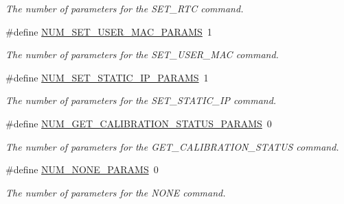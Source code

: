 \begin{DoxyCompactItemize}
\begin{DoxyCompactList}\small\item\em The number of parameters for the S\-E\-T\-\_\-\-R\-T\-C command. \end{DoxyCompactList}\item 
\hypertarget{group__command__interpreter_gaafcaaef444e34052e8d96c863c90543f}{\#define \hyperlink{group__command__interpreter_gaafcaaef444e34052e8d96c863c90543f}{N\-U\-M\-\_\-\-S\-E\-T\-\_\-\-U\-S\-E\-R\-\_\-\-M\-A\-C\-\_\-\-P\-A\-R\-A\-M\-S}~1}\label{group__command__interpreter_gaafcaaef444e34052e8d96c863c90543f}

\begin{DoxyCompactList}\small\item\em The number of parameters for the S\-E\-T\-\_\-\-U\-S\-E\-R\-\_\-\-M\-A\-C command. \end{DoxyCompactList}\item 
\hypertarget{group__command__interpreter_ga4e0199c558a2061732f2e8a1245cb4a2}{\#define \hyperlink{group__command__interpreter_ga4e0199c558a2061732f2e8a1245cb4a2}{N\-U\-M\-\_\-\-S\-E\-T\-\_\-\-S\-T\-A\-T\-I\-C\-\_\-\-I\-P\-\_\-\-P\-A\-R\-A\-M\-S}~1}\label{group__command__interpreter_ga4e0199c558a2061732f2e8a1245cb4a2}

\begin{DoxyCompactList}\small\item\em The number of parameters for the S\-E\-T\-\_\-\-S\-T\-A\-T\-I\-C\-\_\-\-I\-P command. \end{DoxyCompactList}\item 
\hypertarget{group__command__interpreter_ga4fc716dc88ef0cbdbc503e78eab47df4}{\#define \hyperlink{group__command__interpreter_ga4fc716dc88ef0cbdbc503e78eab47df4}{N\-U\-M\-\_\-\-G\-E\-T\-\_\-\-C\-A\-L\-I\-B\-R\-A\-T\-I\-O\-N\-\_\-\-S\-T\-A\-T\-U\-S\-\_\-\-P\-A\-R\-A\-M\-S}~0}\label{group__command__interpreter_ga4fc716dc88ef0cbdbc503e78eab47df4}

\begin{DoxyCompactList}\small\item\em The number of parameters for the G\-E\-T\-\_\-\-C\-A\-L\-I\-B\-R\-A\-T\-I\-O\-N\-\_\-\-S\-T\-A\-T\-U\-S command. \end{DoxyCompactList}\item 
\hypertarget{group__command__interpreter_ga6581408fc45ede8a8c643b4700e4113b}{\#define \hyperlink{group__command__interpreter_ga6581408fc45ede8a8c643b4700e4113b}{N\-U\-M\-\_\-\-N\-O\-N\-E\-\_\-\-P\-A\-R\-A\-M\-S}~0}\label{group__command__interpreter_ga6581408fc45ede8a8c643b4700e4113b}

\begin{DoxyCompactList}\small\item\em The number of parameters for the N\-O\-N\-E command. \end{DoxyCompactList}\end{DoxyCompactItemize}
